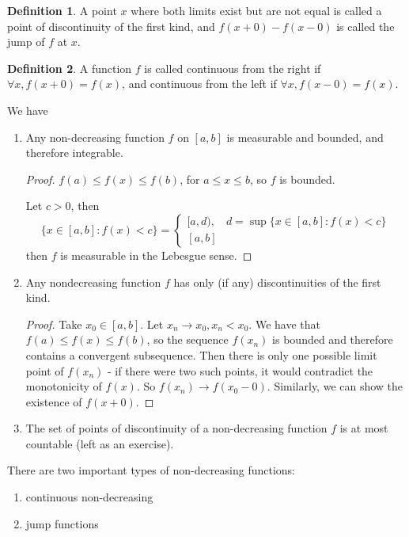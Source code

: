 \documentclass[11pt,a4paper]{report}
\theoremstyle{plain}
\theoremstyle{definition}
\newtheorem*{defn}{Definition}
\theoremstyle{remark}
\begin{document}
\begin{defn}
    A point $x$ where both limits exist but are not equal is called a point of discontinuity of the first kind, and $f(x + 0) - f(x - 0)$ is called the jump of $f$ at $x$.
\end{defn}

\begin{defn}
    A function $f$ is called continuous from the right if $\forall x, f(x + 0) = f(x)$, and continuous from the left if $\forall x, f(x - 0) = f(x)$.
\end{defn}

We have
\begin{enumerate}
  \item Any non-decreasing function $f$ on $[a, b]$ is measurable and bounded, and therefore integrable.
    \begin{proof}
      $f(a) \le f(x) \le f(b)$, for $a \le x \le b$, so $f$ is bounded. 
        
        Let $c > 0$, then
        $$ 
        \{ x \in [a, b] : f(x) < c \} = \begin{cases}
          [a, d), & d = \sup\{x \in [a, b] : f(x) < c \} \\
          [a, b]
        \end{cases}
        $$
        then $f$ is measurable in the Lebesgue sense.
    \end{proof}
 \item Any nondecreasing function $f$ has only (if any) discontinuities of the first kind.
    \begin{proof}
        Take $x_0 \in [a, b]$. Let $x_n \rightarrow x_0, x_n < x_0$. We have that $f(a) \le f(x) \le f(b)$, so the sequence $f(x_n)$ is bounded and therefore contains a convergent subsequence. Then there is only one possible limit point of $f(x_n)$ - if there were two such points, it would contradict the monotonicity of $f(x)$. So $f(x_n) \rightarrow f(x_0 - 0)$. Similarly, we can show the existence of $f(x + 0)$.
    \end{proof}
  \item The set of points of discontinuity of a non-decreasing function $f$ is at most countable (left as an exercise).
\end{enumerate}

There are two important types of non-decreasing functions:
\begin{enumerate}
  \item continuous non-decreasing
  \item jump functions
\end{enumerate}
    
\end{document}
